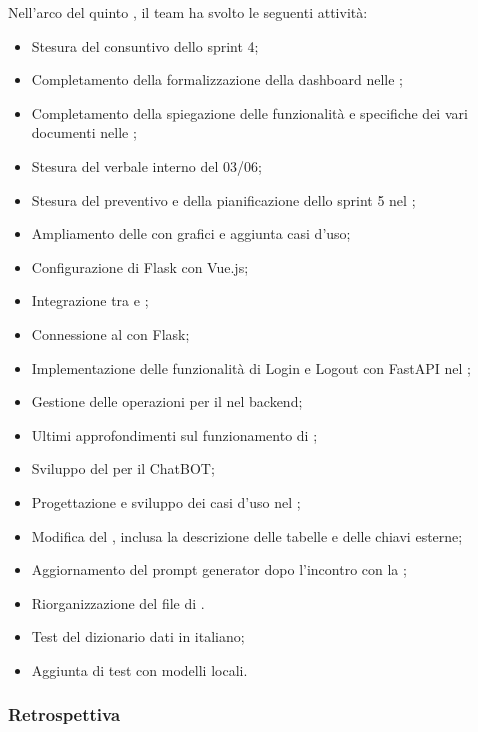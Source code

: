 Nell'arco del quinto , il team ha svolto le seguenti attività:
\begin{itemize}
  \item Stesura del consuntivo dello sprint 4;
  \item Completamento della formalizzazione della dashboard  nelle \NdP;
  \item Completamento della spiegazione delle funzionalità e specifiche dei vari documenti nelle \NdP;
  \item Stesura del verbale interno del 03/06;
  \item Stesura del preventivo e della pianificazione dello sprint 5 nel \PdP;
  \item Ampliamento delle \AdR con grafici e aggiunta casi d’uso;
  \item Configurazione di Flask con Vue.js;
  \item Integrazione tra  e ;
  \item Connessione al  con Flask;
  \item Implementazione delle funzionalità di Login e Logout con FastAPI nel ;
  \item Gestione delle operazioni  per il  nel backend;
  \item Ultimi approfondimenti sul funzionamento di ;
  \item Sviluppo del  per il ChatBOT;
  \item Progettazione e sviluppo dei casi d’uso nel ;
  \item Modifica del , inclusa la descrizione delle tabelle e delle chiavi esterne;
  \item Aggiornamento del prompt generator dopo l'incontro con la ;
  \item Riorganizzazione del file di .
  \item Test del dizionario dati in italiano;
  \item Aggiunta di test con modelli locali.
\end{itemize}

\subsubsection{Retrospettiva}

